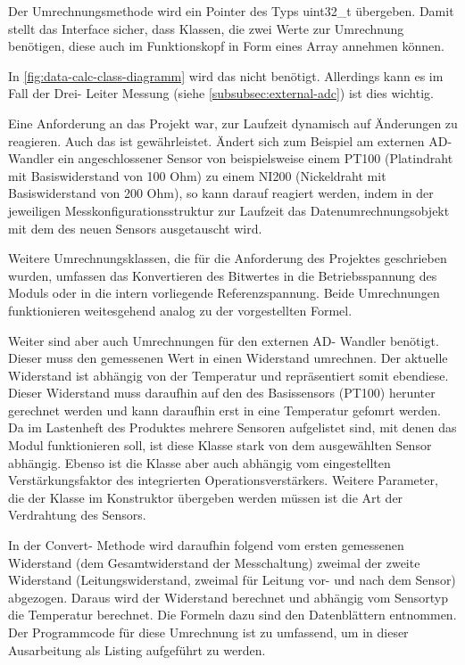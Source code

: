 Der Umrechnungsmethode wird ein Pointer des Typs uint32\_t übergeben.
Damit stellt das Interface sicher, dass Klassen, die zwei Werte zur Umrechnung benötigen, diese auch im Funktionskopf in Form eines Array annehmen können.

In \autoref{fig:data-calc-class-diagramm} wird das nicht benötigt. 
Allerdings kann es im Fall der Drei- Leiter Messung (siehe \autoref{subsubsec:external-adc}) ist dies wichtig.

Eine Anforderung an das Projekt war, zur Laufzeit dynamisch auf Änderungen zu reagieren.
Auch das ist gewährleistet.
Ändert sich zum Beispiel am externen AD- Wandler ein angeschlossener Sensor von beispielsweise einem PT100 (Platindraht mit Basiswiderstand von 100 Ohm) zu einem NI200 (Nickeldraht mit Basiswiderstand von 200 Ohm), so kann darauf reagiert werden, indem in der jeweiligen Messkonfigurationsstruktur zur Laufzeit das Datenumrechnungsobjekt mit dem des neuen Sensors ausgetauscht wird.

Weitere Umrechnungsklassen, die für die Anforderung des Projektes geschrieben wurden, umfassen das Konvertieren des Bitwertes in die Betriebsspannung des Moduls oder in die intern vorliegende Referenzspannung.
Beide Umrechnungen funktionieren weitesgehend analog zu der vorgestellten Formel.

Weiter sind aber auch Umrechnungen für den externen AD- Wandler benötigt.
Dieser muss den gemessenen Wert in einen Widerstand umrechnen.
Der aktuelle Widerstand ist abhängig von der Temperatur und repräsentiert somit ebendiese.
Dieser Widerstand muss daraufhin auf den des Basissensors (PT100) herunter gerechnet werden und kann daraufhin erst in eine Temperatur gefomrt werden.\newline
Da im Lastenheft des Produktes mehrere Sensoren aufgelistet sind, mit denen das Modul funktionieren soll, ist diese Klasse stark von dem ausgewählten Sensor abhängig.
Ebenso ist die Klasse aber auch abhängig vom eingestellten Verstärkungsfaktor des integrierten Operationsverstärkers.\newline
Weitere Parameter, die der Klasse im Konstruktor übergeben werden müssen ist die Art der Verdrahtung des Sensors.

In der Convert- Methode wird daraufhin folgend vom ersten gemessenen Widerstand (dem Gesamtwiderstand der Messchaltung) zweimal der zweite Widerstand (Leitungswiderstand, zweimal für Leitung vor- und nach dem Sensor) abgezogen. 
Daraus wird der Widerstand berechnet und abhängig vom Sensortyp die Temperatur berechnet.
Die Formeln dazu sind den Datenblättern entnommen.
Der Programmcode für diese Umrechnung ist zu umfassend, um in dieser Ausarbeitung als Listing aufgeführt zu werden.


